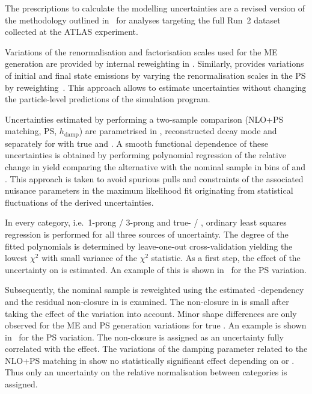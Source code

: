 The prescriptions to calculate the \ttbar modelling uncertainties are
a revised version of the methodology outlined
in~\cite{ATL-PHYS-PUB-2020-023} for analyses targeting the full Run~2
dataset collected at the ATLAS experiment.

Variations of the renormalisation and factorisation scales used for
the ME generation are provided by internal reweighting in
\POWHEGBOX[v2]. Similarly, \PYTHIA[8] provides variations of initial
and final state emissions by varying the renormalisation scales in the
PS by reweighting~\cite{Mrenna:2016sih}. This approach allows to
estimate uncertainties without changing the particle-level predictions
of the simulation program.

Uncertainties estimated by performing a two-sample comparison (NLO+PS
matching, PS, $h_\text{damp}$) are parametrised in \tauhadvis \pT,
reconstructed \tauhad decay mode and \mTW separately for \ttbar with
true and \faketauhadvis. A smooth functional dependence of these
uncertainties is obtained by performing polynomial regression of the
relative change in yield comparing the alternative with the nominal
sample in bins of \tauhadvis \pT and \mTW. This approach is taken to
avoid spurious pulls and constraints of the associated nuisance
parameters in the maximum likelihood fit originating from statistical
fluctuations of the derived uncertainties.

In every category, i.e.\ 1-prong / 3-prong \tauhadvis and true- /
\faketauhadvis, ordinary least squares regression is performed for all
three sources of uncertainty. The degree of the fitted polynomials is
determined by leave-one-out cross-validation yielding the lowest
$\chi^2$ with small variance of the $\chi^2$ statistic. As a first
step, the effect of the uncertainty on \tauhadvis \pT is estimated. An
example of this is shown
in~
for the PS variation.

Subsequently, the nominal sample is reweighted using the estimated
\pT-dependency and the residual non-closure in \mTW is examined. The
non-closure in \mTW is small after taking the \tauhadvis \pT effect of
the variation into account. Minor shape differences are only observed
for the ME and PS generation variations for true \tauhadvis. An
example is shown
in~
for the PS variation. The non-closure is assigned as an uncertainty
fully correlated with the \pT effect. The variations of the damping
parameter related to the NLO+PS matching in \POWHEG show no
statistically significant effect depending on \tauhadvis or \mTW. Thus
only an uncertainty on the relative normalisation between categories
is assigned.

